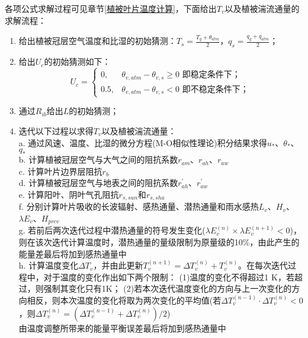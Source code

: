 各项公式求解过程可见章节\ref{植被叶片温度计算}，下面给出$T_v$以及植被湍流通量的求解流程：
\begin{enumerate}
    \item 给出植被冠层空气温度和比湿的初始猜测：$T_s=\frac{T_g+\theta_{atm}}{2}$，$q_s=\frac{q_g+q_{atm}}{2}$；
    \item 给出$U_c$的初始猜测如下：\\
    \begin{equation*}
    U_c= \begin{cases}
      0,  & \theta_{v,atm}-\theta_{v,s}\geqslant0 \text{ 即稳定条件下；} \\
      0.5, & \theta_{v,atm}-\theta_{v,s}<0 \text{ 即不稳定条件下；}
     \end{cases}
    \end{equation*}
    \item 通过$R_{ib}$给出$L$的初始猜测；
    \item 迭代以下过程以求得$T_v$以及植被湍流通量：\\
    a. 通过风速、温度、比湿的微分方程(M-O相似性理论)积分结果求得$u_\ast$、$\theta_\ast$、$q_\ast$ \\
    b. 计算植被冠层空气与大气之间的阻抗系数$r_{am}$、$r_{ah}$、$r_{aw}$ \\
    c. 计算叶片边界层阻抗$r_b$ \\
    d. 计算植被冠层空气与地表之间的阻抗系数$r_{ah}^\prime$、$r_{aw}^\prime$ \\
    e. 计算阳叶、阴叶气孔阻抗$r_{s,sun}$和$r_{s,sha}$ \\
    f. 分别计算叶片吸收的长波辐射、感热通量、潜热通量和雨水感热$L_v$、$H_{v}$、$\lambda E_{v}$、$H_{prcv}$ \\
    g. 若前后两次迭代过程中潜热通量的符号发生变化($\lambda E_{v}^{\left(n\right)}\times\lambda E_{v}^{\left(n+1\right)}<0$)，
    则在该次迭代计算温度时，潜热通量的量级限制为原量级的10\%，由此产生的能量差最后将加到感热通量中 \\
    h. 计算温度变化$\Delta T_v$，并由此更新$T_v^{\left(n+1\right)}=\Delta T_v^{\left(n\right)}+T_v^{\left(n\right)}$。在每次迭代过程中，对于温度的变化作出如下两个限制：
    (1)温度的变化不得超过1 K，若超过，则强制其变化只有1K；
    (2)若本次迭代温度变化的方向与上一次变化的方向相反，则本次温度的变化将取为两次变化的平均值(若$\Delta T_v^{\left(n-1\right)} \cdot \Delta T_v^{\left(n\right)}<0$，则$\Delta T_v^{\left(n\right)}=\left(\Delta T_v^{\left(n-1\right)}+\Delta T_v^{\left(n\right)}\right)/2$)\\
    由温度调整所带来的能量平衡误差最后将加到感热通量中\\

\end{enumerate}
